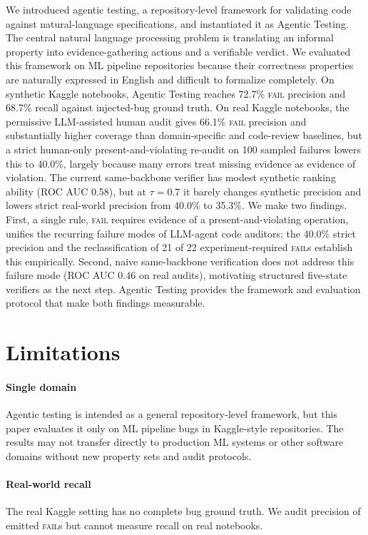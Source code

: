 \documentclass[11pt]{article}
\begin{document}
We introduced agentic testing, a repository-level framework for validating code against natural-language specifications, and instantiated it as Agentic Testing.
The central natural language processing problem is translating an informal property into evidence-gathering actions and a verifiable verdict.
We evaluated this framework on ML pipeline repositories because their correctness properties are naturally expressed in English and difficult to formalize completely.
On synthetic Kaggle notebooks, Agentic Testing reaches 72.7\% \textsc{fail} precision and 68.7\% recall against injected-bug ground truth.
On real Kaggle notebooks, the permissive LLM-assisted human audit gives 66.1\% \textsc{fail} precision and substantially higher coverage than domain-specific and code-review baselines, but a strict human-only present-and-violating re-audit on 100 sampled failures lowers this to 40.0\%, largely because many errors treat missing evidence as evidence of violation.
The current same-backbone verifier has modest synthetic ranking ability (ROC AUC 0.58), but at $\tau=0.7$ it barely changes synthetic precision and lowers strict real-world precision from 40.0\% to 35.3\%.
We make two findings.
First, a single rule, \textsc{fail} requires evidence of a present-and-violating operation, unifies the recurring failure modes of LLM-agent code auditors; the 40.0\% strict precision and the reclassification of 21 of 22 experiment-required \textsc{fail}s establish this empirically.
Second, naive same-backbone verification does not address this failure mode (ROC AUC 0.46 on real audits), motivating structured five-state verifiers as the next step.
Agentic Testing provides the framework and evaluation protocol that make both findings measurable.

\section*{Limitations}

\paragraph{Single domain}
Agentic testing is intended as a general repository-level framework, but this paper evaluates it only on ML pipeline bugs in Kaggle-style repositories.
The results may not transfer directly to production ML systems or other software domains without new property sets and audit protocols.

\paragraph{Real-world recall}
The real Kaggle setting has no complete bug ground truth.
We audit precision of emitted \textsc{fail}s but cannot measure recall on real notebooks.
\end{document}

